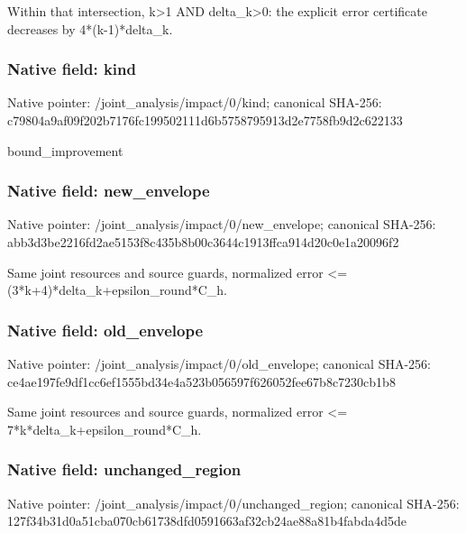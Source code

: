 \documentclass[10pt,a4paper]{article}
\begin{document}
\begingroup\raggedright\sloppy Within that intersection,\allowbreak{} k>1 AND delta\_\allowbreak{}k>0:\allowbreak{} the explicit error certificate decreases by 4*(k-1)*delta\_\allowbreak{}k.\par\endgroup

\subsubsection{Native field: kind}
Native pointer: /joint\_\allowbreak{}analysis/impact/0/kind; canonical SHA-256: c79804a9af09f202b7176fc199502111d6b5758795913d2e7758fb9d2c622133

\begingroup\raggedright\sloppy bound\_\allowbreak{}improvement\par\endgroup

\subsubsection{Native field: new\_\allowbreak{}envelope}
Native pointer: /joint\_\allowbreak{}analysis/impact/0/new\_\allowbreak{}envelope; canonical SHA-256: abb3d3be2216fd2ae5153f8c435b8b00c3644c1913ffca914d20c0e1a20096f2

\begingroup\raggedright\sloppy Same joint resources and source guards,\allowbreak{} normalized error <=\allowbreak{} (3*k+4)*delta\_\allowbreak{}k+epsilon\_\allowbreak{}round*C\_\allowbreak{}h.\par\endgroup

\subsubsection{Native field: old\_\allowbreak{}envelope}
Native pointer: /joint\_\allowbreak{}analysis/impact/0/old\_\allowbreak{}envelope; canonical SHA-256: ce4ae197fe9df1cc6ef1555bd34e4a523b056597f626052fee67b8c7230cb1b8

\begingroup\raggedright\sloppy Same joint resources and source guards,\allowbreak{} normalized error <=\allowbreak{} 7*k*delta\_\allowbreak{}k+epsilon\_\allowbreak{}round*C\_\allowbreak{}h.\par\endgroup

\subsubsection{Native field: unchanged\_\allowbreak{}region}
Native pointer: /joint\_\allowbreak{}analysis/impact/0/unchanged\_\allowbreak{}region; canonical SHA-256: 127f34b31d0a51cba070cb61738dfd0591663af32cb24ae88a81b4fabda4d5de
\end{document}
